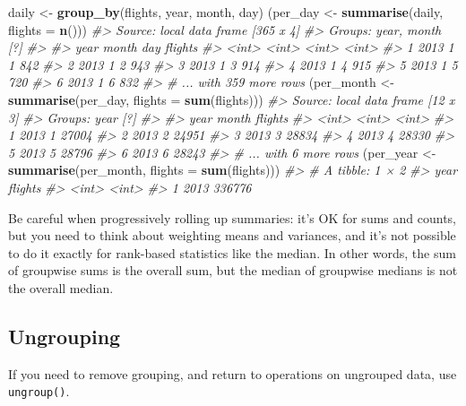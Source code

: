 \documentclass[]{book}
\newenvironment{Shaded}{\begin{snugshade}}{\end{snugshade}}
\newcommand{\KeywordTok}[1]{\textcolor[rgb]{0.13,0.29,0.53}{\textbf{{#1}}}}
\newcommand{\DataTypeTok}[1]{\textcolor[rgb]{0.13,0.29,0.53}{{#1}}}
\newcommand{\StringTok}[1]{\textcolor[rgb]{0.31,0.60,0.02}{{#1}}}
\newcommand{\CommentTok}[1]{\textcolor[rgb]{0.56,0.35,0.01}{\textit{{#1}}}}
\newcommand{\NormalTok}[1]{{#1}}
\begin{document}
\begin{Shaded}
\begin{Highlighting}[]
\NormalTok{daily <-}\StringTok{ }\KeywordTok{group_by}\NormalTok{(flights, year, month, day)}
\NormalTok{(per_day   <-}\StringTok{ }\KeywordTok{summarise}\NormalTok{(daily, }\DataTypeTok{flights =} \KeywordTok{n}\NormalTok{()))}
\CommentTok{#> Source: local data frame [365 x 4]}
\CommentTok{#> Groups: year, month [?]}
\CommentTok{#> }
\CommentTok{#>    year month   day flights}
\CommentTok{#>   <int> <int> <int>   <int>}
\CommentTok{#> 1  2013     1     1     842}
\CommentTok{#> 2  2013     1     2     943}
\CommentTok{#> 3  2013     1     3     914}
\CommentTok{#> 4  2013     1     4     915}
\CommentTok{#> 5  2013     1     5     720}
\CommentTok{#> 6  2013     1     6     832}
\CommentTok{#> # ... with 359 more rows}
\NormalTok{(per_month <-}\StringTok{ }\KeywordTok{summarise}\NormalTok{(per_day, }\DataTypeTok{flights =} \KeywordTok{sum}\NormalTok{(flights)))}
\CommentTok{#> Source: local data frame [12 x 3]}
\CommentTok{#> Groups: year [?]}
\CommentTok{#> }
\CommentTok{#>    year month flights}
\CommentTok{#>   <int> <int>   <int>}
\CommentTok{#> 1  2013     1   27004}
\CommentTok{#> 2  2013     2   24951}
\CommentTok{#> 3  2013     3   28834}
\CommentTok{#> 4  2013     4   28330}
\CommentTok{#> 5  2013     5   28796}
\CommentTok{#> 6  2013     6   28243}
\CommentTok{#> # ... with 6 more rows}
\NormalTok{(per_year  <-}\StringTok{ }\KeywordTok{summarise}\NormalTok{(per_month, }\DataTypeTok{flights =} \KeywordTok{sum}\NormalTok{(flights)))}
\CommentTok{#> # A tibble: 1 × 2}
\CommentTok{#>    year flights}
\CommentTok{#>   <int>   <int>}
\CommentTok{#> 1  2013  336776}
\end{Highlighting}
\end{Shaded}

Be careful when progressively rolling up summaries: it's OK for sums and
counts, but you need to think about weighting means and variances, and
it's not possible to do it exactly for rank-based statistics like the
median. In other words, the sum of groupwise sums is the overall sum,
but the median of groupwise medians is not the overall median.

\subsection{Ungrouping}\label{ungrouping}

If you need to remove grouping, and return to operations on ungrouped
data, use \texttt{ungroup()}.
\end{document}
